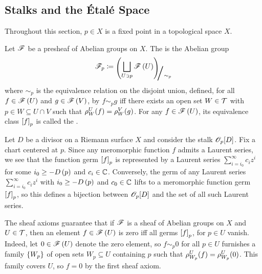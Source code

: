 \documentclass[../Moduli_Spaces_of_Riemann_Surfaces.tex]{subfiles}
\begin{document}
    \subsection{Stalks and the Étalé Space}
    Throughout this section, $p\in X$ is a fixed point in a topological space $X$.
    \begin{definition}
        Let $\mathscr{F}$ be a presheaf of Abelian groups on $X$. The  is the Abelian group
        \begin{equation*}
            \ms{F}_p\coloneqq\raisebox{-2pt}{$\Biggl(\!$}\bigsqcup_{U\ni p}\ms{F}\l(U\r)\!\raisebox{-2pt}{$\Biggr)$}\!\!_{\scalebox{2}{/}\sim_p}
        \end{equation*}
        where $\sim_p$ is the equivalence relation on the disjoint union, defined, for all $f\in\mathscr{F}\left(U\right)$ and $g\in\mathscr{F}\left(V\right)$, by $f\sim_p g$ iff there exists an open set $W\in\mathcal{T}$ with $p\in W\subseteq U\cap V$ such that $\rho^U_W\!\left(f\right)=\rho^V_W\!\left(g\right)$. For any $f\in\mathscr{F}\left(U\right)$, its equivalence class $\left[f\right]_p$ is called the .
    \end{definition}
    \begin{example}
        Let $D$ be a divisor on a Riemann surface $X$ and consider the stalk $\mathscr{O}_p\!\left[D\right]$. Fix a chart centered at $p$. Since any meromorphic function $f$ admits a Laurent series, we see that the function germ $\left[f\right]_p$ is represented by a Laurent series $\sum_{i=i_0}^{\infty}c_iz^i$ for some $i_0\geq-D\left(p\right)$ and $c_i\in\mathbb{C}$. Conversely, the germ of any Laurent series $\sum_{i=i_0}^{\infty}c_iz^i$ with $i_0\geq-D\left(p\right)$ and $c_0\in\mathbb{C}$ lifts to a meromorphic function germ $\left[f\right]_p$, so this defines a bijection between $\mathscr{O}_p\!\left[D\right]$ and the set of all such Laurent series.\exqed
    \end{example}
    \begin{remark}
        The sheaf axioms guarantee that if $\mathscr{F}$ is a sheaf of Abelian groups on $X$ and $U\in\mathcal{T}$, then an element $f\in\mathscr{F}\left(U\right)$ is zero iff all germs $\left[f\right]_p$, for $p\in U$ vanish. Indeed, let $0\in\mathscr{F}\left(U\right)$ denote the zero element, so $f\sim_p0$ for all $p\in U$ furnishes a family $\left\{W_p\right\}$ of open sets $W_p\subseteq U$ containing $p$ such that $\rho^U_{W_p}\!\left(f\right)=\rho^U_{W_p}\!\left(0\right)$. This family covers $U$, so $f=0$ by the first sheaf axiom.\exqed
    \end{remark}
\end{document}
